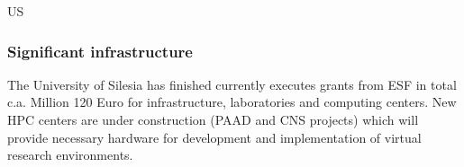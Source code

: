 \begin{sitedescription}{US}
\subsubsection*{Significant infrastructure}

The University of Silesia has finished currently executes grants from
ESF in total c.a. Million 120 Euro for infrastructure, laboratories and
computing centers. New HPC centers are under construction (PAAD and
CNS projects) which will provide necessary hardware for development
and implementation of virtual research environments.



\end{sitedescription}

